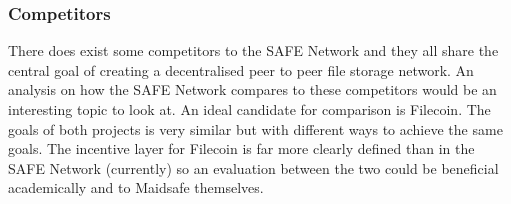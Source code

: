 \subsubsection{Competitors}

There does exist some competitors to the SAFE Network and they all share the central goal of creating a decentralised peer to peer file storage network. An analysis on how the SAFE Network compares to these competitors would be an interesting topic to look at. An ideal candidate for comparison is Filecoin\cite{filecoin}. The goals of both projects is very similar but with different ways to achieve the same goals. The incentive layer for Filecoin is far more clearly defined than in the SAFE Network (currently) so an evaluation between the two could be beneficial academically and to Maidsafe themselves.




